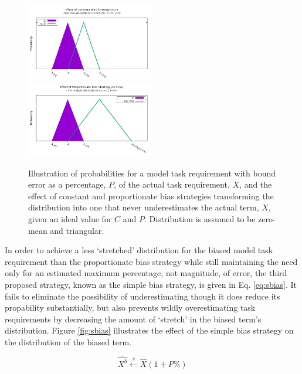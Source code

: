 \documentclass[10pt]{csce}
\begin{document}
\begin{figure}
	\begin{center}
		\includegraphics[width=0.5\textwidth]{figures/BiasVisualization_Constant.pdf}
		\includegraphics[width=0.5\textwidth]{figures/BiasVisualization_Proportionate.pdf}
	\end{center}
	\caption{Illustration of probabilities for a model task requirement
		with bound error as a percentage, $P$, of the actual task
		requirement, $X$, and the effect of constant and proportionate
		bias strategies transforming the distribution into
		one that never underestimates the actual term, $X$, given an
		ideal value for $C$ and $P$.  Distribution is assumed to be
		zero-mean and triangular.}
	\label{fig:cpbias}
\end{figure}

In order to achieve a less `stretched' distribution for the biased model task
requirement than the proportionate bias strategy while still maintaining the
need only for an estimated maximum percentage, not magnitude, of error, the
third proposed strategy, known as the simple bias strategy, is given in Eq.
\ref{eq:sbias}.  It fails to eliminate the possibility of underestimating
though it does reduce its propability substantially, but also prevents wildly
overestimating task requirements by decreasing the amount of `stretch' in the
biased term's distribution.  Figure \ref{fig:sbias} illustrates the effect of
the simple bias strategy on the distribution of the biased term.

\begin{equation}
\hat{X^b} \xleftarrow{s} \hat{X} (1 + P\%)
\label{eq:sbias}
\end{equation}
\end{document}
